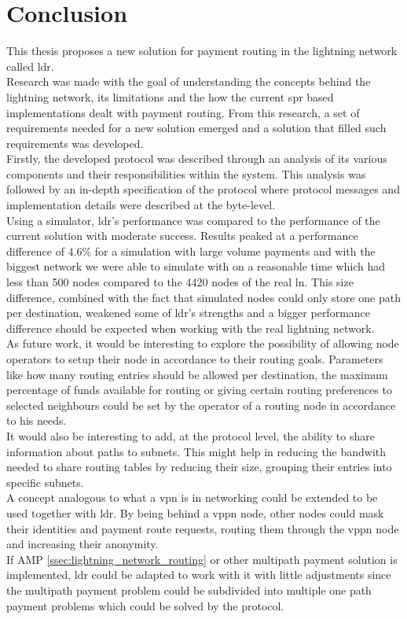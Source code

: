 \section{Conclusion}

This thesis proposes a new solution for payment routing in the lightning network called \acrfull{ldr}.\\
Research was made with the goal of understanding the concepts behind the lightning network, its limitations and the how the current \acrfull{spr} based implementations dealt with payment routing. From this research, a set of requirements needed for a new solution emerged and a solution that filled such requirements was developed.\\
Firstly, the developed protocol was described through an analysis of its various components and their responsibilities within the system. This analysis was followed by an in-depth specification of the protocol where protocol messages and implementation details were described at the byte-level.\\
Using a simulator, \acrshort{ldr}'s performance  was compared to the performance of the current solution with moderate success. Results peaked at a performance difference of $4.6\%$ for a simulation with large volume payments and with the biggest network we were able to simulate with on a reasonable time which had less than 500 nodes compared to the 4420 nodes of the real \acrshort{ln}. This size difference, combined with the fact that simulated nodes could only store one path per destination, weakened some of \acrshort{ldr}'s strengths and a bigger performance difference should be expected when working with the real lightning network.\\
As future work, it would be interesting to explore the possibility of allowing node operators to setup their node in accordance to their routing goals. Parameters like how many routing entries should be allowed per destination, the maximum percentage of funds available for routing or giving certain routing preferences to selected neighbours could be set by the operator of a routing node in accordance to his needs.\\
It would also be interesting to add, at the protocol level, the ability to share information about paths to subnets. This might help in reducing the bandwith needed to share routing tables by reducing their size, grouping their entries into specific subnets.\\
A concept analogous to what a \acrfull{vpn} is in networking could be extended to be used together with \acrshort{ldr}. By being behind a \acrfull{vppn} node, other nodes could mask their identities and payment route requests, routing them through the \acrshort{vppn} node and increasing their anonymity.\\
If AMP \ref{ssec:lightning_network_routing} or other multipath payment solution is implemented, \acrshort{ldr} could be adapted to work with it with little adjustments since the multipath payment problem could be subdivided into multiple one path payment problems which could be solved by the protocol.